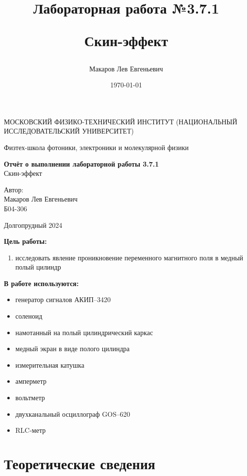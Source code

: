 \documentclass[a4paper,12pt]{article}
\author{Макаров Лев Евгеньевич}
\title{Лабораторная работа №3.7.1

Скин-эффект
}
\date{\today}
\begin{document}
\begin{titlepage}
	\begin{center}
		{\large МОСКОВСКИЙ ФИЗИКО-ТЕХНИЧЕСКИЙ ИНСТИТУТ (НАЦИОНАЛЬНЫЙ ИССЛЕДОВАТЕЛЬСКИЙ УНИВЕРСИТЕТ)}
	\end{center}
	\begin{center}
		{\large Физтех-школа фотоники, электроники и молекулярной физики}
	\end{center}
	
	
	\vspace{4.5cm}
	{\huge
		\begin{center}
			{\bf Отчёт о выполнении лабораторной работы 3.7.1}\\
			Скин-эффект
		\end{center}
	}
	\vspace{2cm}
	\begin{flushright}
		{\LARGE Автор:\\ Макаров Лев Евгеньевич \\
			\vspace{0.2cm}
			Б04-306}
	\end{flushright}
	\vspace{8cm}
	\begin{center}
		Долгопрудный 2024
	\end{center}
\end{titlepage}

\textbf{Цель работы:} 
\begin{enumerate}
	\item исследовать явление проникновение переменного магнитного поля в медный полый цилиндр
\end{enumerate}

\textbf{В работе используются:} 
\begin{itemize}
    \item генератор сигналов АКИП–3420
    \item соленоид
    \item намотанный на полый цилиндрический каркас
    \item медный экран в виде полого цилиндра
    \item измерительная катушка
    \item амперметр
    \item вольтметр
    \item двухканальный осциллограф GOS–620
    \item RLC-метр
\end{itemize}
\medskip

\section{Теоретические сведения}
\end{document}
